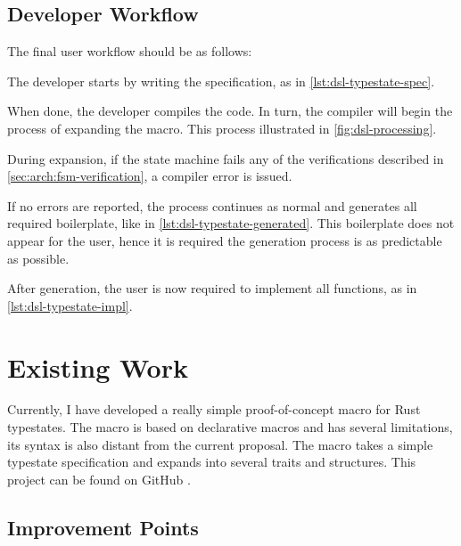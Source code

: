 \subsection{Developer Workflow}
The final user workflow should be as follows:
\begin{compactenum}
    \item The developer starts by writing the specification, as in \autoref{lst:dsl-typestate-spec}.
    \item When done, the developer compiles the code.
    In turn, the compiler will begin the process of expanding the macro.
    This process illustrated in \autoref{fig:dsl-processing}.
    \begin{compactitem}
        \item During expansion, if the state machine fails any of the verifications described in \autoref{sec:arch:fsm-verification},
        a compiler error is issued.
        \item If no errors are reported, the process continues as normal and generates all required boilerplate, like in \autoref{lst:dsl-typestate-generated}.
        This boilerplate does not appear for the user, hence it is required the generation process is as predictable as possible.
    \end{compactitem}
    \item After generation, the user is now required to implement all functions, as in \autoref{lst:dsl-typestate-impl}.
\end{compactenum}


\section{Existing Work}

Currently, I have developed a really simple proof-of-concept macro for Rust typestates.
The macro is based on declarative macros and has several limitations,
its syntax is also distant from the current proposal.
The macro takes a simple typestate specification and expands into several traits and structures.
This project can be found on GitHub \autocite{Duarte2020a}.

\subsection{Improvement Points}

